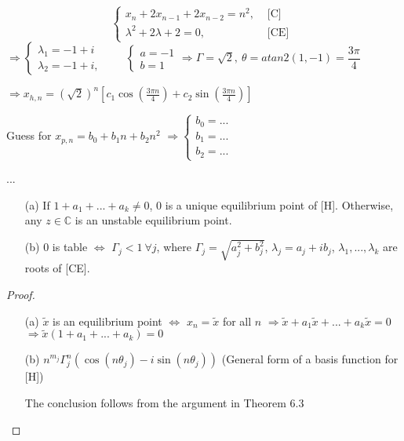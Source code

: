 \documentclass[twoside]{article}
\newcommand\imp{$\Longrightarrow$}
\begin{document}
\begin{example}
    \[
    \begin{cases}
        x_{n} + 2x_{n-1} + 2 x_{n-2} = n^{2}, &\text{ [C] }\\
        \lambda^{2} + 2 \lambda + 2  = 0,     &\text{ [CE] }
    \end{cases}
    \]
    \imp $\begin{cases}
        \lambda_{1} = -1 + i\\    
        \lambda_{2} = -1 + i,       
    \end{cases} \qquad 
    \begin{cases}
        a = -1\\
        b = 1
    \end{cases}
    \Longrightarrow
    \Gamma = \sqrt{2}, ~ \theta = atan2(1,-1) = \dfrac{3\pi}{4}
    $

    \imp $x_{h,n} = (\sqrt{2})^{n} \left[ c_{1} \cos (\frac{3\pi n}{4}) + c_{2} \sin (\frac{3\pi n}{4}) \right]$

    Guess for $x_{p,n} = b_{0}+b_{1} n + b_{2} n^{2}$ \imp $\begin{cases}
        b_{0} = ...\\
        b_{1} = ...\\
        b_{2} = ...
    \end{cases}$

    ...
\end{example}

\begin{theorem}
    \begin{itemize}
        \item [(a)] If $1 + a_1 + ... + a_k \neq 0$, $0$ is a unique equilibrium point of [H]. Otherwise, any $z \in \mathbb{C}$ is an unstable equilibrium point.
        \item [(b)] 0 is table $\iff$ $\Gamma_{j}<1 ~\forall j$, where $\Gamma_{j} = \sqrt{a_{j}^{2} + b_{j}^{2}}$, $\lambda_{j} = a_{j} + i b_{j}$, $\lambda_{1}, ..., \lambda_{k} $ are roots of [CE].
    \end{itemize}
\end{theorem}
\begin{proof}
    \begin{enumerate}
        \item [(a)] $\tilde{x}$ is an equilibrium point $\iff$ $x_{n} = \tilde{x}$ for all $n$ \imp $\tilde{x} + a_1 \tilde{x} + ... + a_k \tilde{x} = 0$ \imp $\tilde{x}( 1+ a_1 + ... + a_k) = 0$
        \item [(b)] $n^{m_{j}} \Gamma_{j}^{n} (\cos(n \theta_{j}) - i \sin(n \theta_{j}))$ (General form of a basis function for [H])

        The conclusion follows from the argument in Theorem 6.3
    \end{enumerate}
\end{proof}
\end{document}

